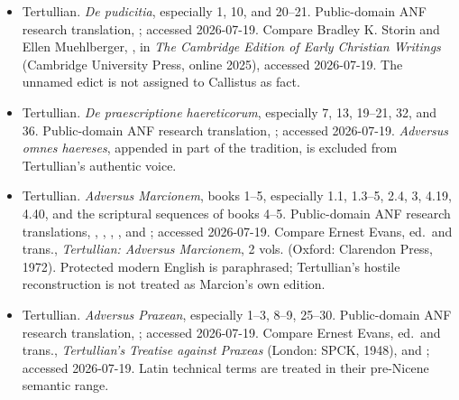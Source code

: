 \begin{itemize}
\item Tertullian. \emph{De pudicitia}, especially 1, 10, and 20--21.
Public-domain ANF research translation,
; accessed
2026-07-19. Compare Bradley K. Storin and Ellen Muehlberger,
, in \emph{The Cambridge
Edition of Early Christian Writings} (Cambridge University Press, online 2025),
accessed 2026-07-19. The unnamed edict is not assigned to Callistus as fact.

\item Tertullian. \emph{De praescriptione haereticorum}, especially 7,
13, 19--21, 32, and 36. Public-domain ANF research translation,
; accessed
2026-07-19. \emph{Adversus omnes haereses}, appended in part of the tradition,
is excluded from Tertullian's authentic voice.

\item Tertullian. \emph{Adversus Marcionem}, books 1--5, especially 1.1,
1.3--5, 2.4, 3, 4.19, 4.40, and the scriptural sequences of books 4--5.
Public-domain ANF research translations,
,
,
,
, and
; accessed
2026-07-19. Compare Ernest Evans, ed.~and trans., \emph{Tertullian: Adversus
Marcionem}, 2 vols. (Oxford: Clarendon Press, 1972). Protected modern English is
paraphrased; Tertullian's hostile reconstruction is not treated as Marcion's
own edition.

\item Tertullian. \emph{Adversus Praxean}, especially 1--3, 8--9, 25--30.
Public-domain ANF research translation,
; accessed
2026-07-19. Compare Ernest Evans, ed.~and trans., \emph{Tertullian's Treatise
against Praxeas} (London: SPCK, 1948), and
; accessed
2026-07-19. Latin technical terms are treated in their pre-Nicene semantic
range.


\end{itemize}
